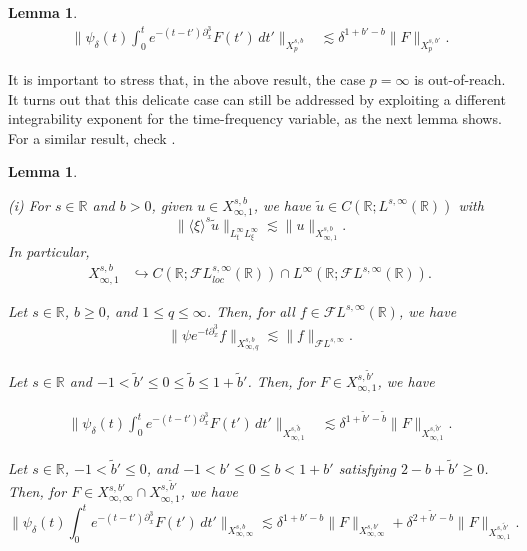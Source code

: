 \documentclass[%
11pt,  reqno]{amsart}
\newcommand{\jap}[1]{\langle #1 \rangle}
\newcommand{\5}{\textup{V}}
\newcommand{\noi}{\noindent}
\newcommand{\FL}{\mathcal{F} L}
\newcommand{\les}{\lesssim}
\newcommand{\dl}{\delta}
\newcommand{\wt}{\widetilde}
\newcommand{\embeds}{\hookrightarrow}
\newcommand{\dx}{\partial_x}
\newtheorem{lemma}[theorem]{Lemma}
\theoremstyle{remark}
\newcommand{\R}{\mathbb{R}}
\numberwithin{equation}{section}
\numberwithin{theorem}{section}
\begin{document}
{\begin{lemma}
			\noi
			\begin{align}
				\label{lin2a_gh}
				\bigg\| \psi_\dl (t) \int_0^t e^{-(t-t')\dx^3 } F(t') \, dt' \bigg\|_{X^{s,b}_{p} } & \les \dl^{1+b'-b} \| F \|_{X^{s,b'}_{p}}.
			\end{align}
		\end{lemma}
		
		It is important to stress that, in the above result, the case $p=\infty$ is out-of-reach. It turns out that this delicate case can still be addressed by exploiting a different integrability exponent for the time-frequency variable, as the next lemma shows. For a similar result, check \cite[Section 7]{CC24}. 
		
		\begin{lemma}\label{lem:linear_estimates}
			
			
			{\rm(i)} For $s\in\R$ and $b>0$,  given $u\in X^{s,b}_{\infty,1}$, we have $\tilde{u}\in C(\R;L^{s,\infty}(\R))$ with
			\begin{equation}\label{lin}
				\|\jap{\xi}^s\tilde{u}\|_{L^\infty_tL^{\infty}_\xi}\lesssim \|u\|_{X^{s,b}_{\infty,1}}.
			\end{equation}
			In particular,
			\noi
			\begin{align}
				X^{s,b}_{\infty, 1} &\embeds C(\R; \FL_{loc}^{s,\infty}(\R))\cap L^\infty(\R; \mathcal{F}L^{s,\infty}(\R)).
			\end{align}
			
			
			\smallskip
			
			
			\noi {\rm(ii)} Let $s\in\R$, $b\ge0$, and $1\le q \le \infty$. Then, for all $f \in \FL^{s,\infty}(\R)$, we have
			\begin{align}
				\label{lin1}
				\| \psi e^{-t\dx^3} f \|_{X^{s,b}_{\infty,q}} \les \| f \|_{\FL^{s,\infty}}.
			\end{align}
			
			
			
			\noi{\rm(iii)} Let $s\in\R$ and $-1<\tilde{b}' \le 0 \le \tilde{b} \le 1+\tilde{b}'$. Then, for $F\in X^{s,\tilde{b}'}_{\infty,1}$, we have
			
			\noi
			\begin{align}
				\label{lin2a}
				\bigg\| \psi_\dl (t) \int_0^t e^{-(t-t')\dx^3 } F(t') \, dt' \bigg\|_{X^{s,\tilde{b}}_{\infty,1} } & \les \dl^{1+\tilde{b}'-\tilde{b}} \| F \|_{X^{s,\tilde{b}'}_{\infty,1}}.
			\end{align}
			
			
			
			\noi{\rm(iv)} Let $s\in\R$, $-1 < \wt{b}'\le 0$, and $-1<b' \le 0 \le b < 1+b'$ satisfying $2-b+\tilde{b}'\ge 0$. Then, for $F\in X^{s,b'}_{\infty, \infty} \cap X^{s, \wt{b}'}_{\infty, 1}$, we have
			\begin{equation}
				\label{lin2b}
				\bigg\| \psi_\dl (t) \int_0^t e^{-(t-t')\dx^3} F(t') \, dt' \bigg\|_{X^{s,b}_{\infty, \infty} } \les \dl^{1+b'-b} \| F\|_{X^{s, b'}_{\infty, \infty}} + \dl^{2+\wt{b}' -b} \|F\|_{X^{s, \wt{b}'}_{\infty, 1}}.
			\end{equation}
			

\end{lemma}}
\end{document}
